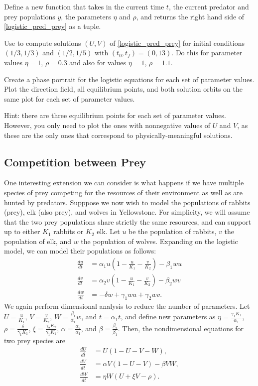 \begin{problem}
Define a new function  that takes in the current time $t$, the current predator and prey populations $y$, the parameters $\eta$ and $\rho$, and returns the right hand side of \eqref{logistic_pred_prey} as a tuple.

Use  to compute solutions $(U,V)$ of \eqref{logistic_pred_prey}
for initial conditions $(1/3, 1/3)$ and $(1/2, 1/5)$ with $(t_0,t_f)=(0,13)$.
Do this for parameter values $\eta=1$, $\rho = 0.3$ and also for values $\eta=1$, $\rho = 1.1$.

Create a phase portrait for the logistic equations for each set of parameter values.
Plot the direction field, all equilibrium points, and both solution orbits on the same plot for each set of parameter values.

Hint: there are three equilibrium points for each set of parameter values.
However, you only need to plot the ones with nonnegative values of $U$ and $V$, as these are the only ones that correspond to physically-meaningful solutions.
\end{problem} 

\subsection*{Competition between Prey}
One interesting extension we can consider is what happens if we have multiple species of prey competing for the resources of their environment as well as are hunted by predators.
Supppose we now wish to model the populations of rabbits (prey), elk (also prey), and wolves in Yellowstone.
For simplicity, we will assume that the two prey populations share strictly the same resources, and can support up to either $K_1$ rabbits or $K_2$ elk.
Let $u$ be the population of rabbits, $v$ the population of elk, and $w$ the population of wolves.
Expanding on the logistic model, we can model their populations as follows:
\begin{align*}
\frac{du}{dt}&=\alpha_1 u\left(1-\frac{u}{K_1}-\frac{v}{K_2}\right)-\beta_1wu
\\
\frac{dv}{dt}&=\alpha_2 v\left(1-\frac{u}{K_1}-\frac{v}{K_2}\right)-\beta_2wv
\\
\frac{dw}{dt}&=-\delta w + \gamma_1 wu + \gamma_2 wv.
\end{align*}
We again perform dimensional analysis to reduce the number of parameters.
Let $U=\frac{u}{K_1}$, $V=\frac{v}{K_2}$, $W=\frac{\beta_1}{\alpha_1}w$, and $\bar t=\alpha_1 t$, and define new parameters as $\eta=\frac{\gamma_1K_1}{\alpha_1}$, $\rho=\frac{\delta}{\gamma_1K_1}$, $\xi=\frac{\gamma_2K_2}{\gamma_1K_1}$, $\alpha=\frac{\alpha_2}{\alpha_1}$, and $\beta=\frac{\beta_2}{\beta_1}$.
Then, the nondimensional equations for two prey species are
\begin{equation}\label{eqn:two-prey-species}
	\begin{split}
	\frac{dU}{d\overline{t}} &= U(1-U-V-W),\\
	\frac{dV}{d\overline{t}} &= \alpha V(1-U-V) - \beta VW,\\
	\frac{dW}{d\overline{t}} &= \eta W(U+\xi V-\rho).
	\end{split}
\end{equation}

